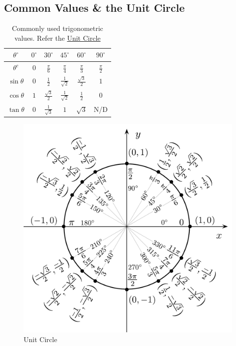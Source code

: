 \documentclass[12pt]{article}
\begin{document}
\subsection{Common Values \& the Unit Circle}
\begin{table}[h]
	\centering
	\renewcommand{\arraystretch}{1.5}
	\begin{tabular}{cccccc}
		\toprule
		$\theta ^ \circ$ & $0^ \circ$ & $30^ \circ$ & $45^ \circ$ & $60^ \circ$ & $90^ \circ$ \\ \midrule
		$\theta ^ c$ & $0$ & $\frac{\pi}{6}$ & $\frac{\pi}{4}$ & $\frac{\pi}{3}$ & $\frac{\pi}{2}$ \\ \midrule
		$\sin \theta$ & $0$ & $\frac{1}{2}$ & $\frac{1}{\sqrt{2}}$ & $\frac{\sqrt{3}}{2}$ & $1$ \\
		$\cos \theta$ & $1$ & $\frac{\sqrt{3}}{2}$ & $\frac{1}{\sqrt{2}}$ & $\frac{1}{2}$ & $0$ \\
		$\tan \theta$ & 0 & $\frac{1}{\sqrt{3}}$ & $1$ & $\sqrt{3}$ & N/D \\ \bottomrule
	\end{tabular}
	\caption{\label{standardvals}Commonly used trigonometric values. Refer the \hyperref[unitcircle]{Unit Circle}}
\end{table}
\begin{figure}[h]
	\centering
	\includegraphics[scale=0.8]{Unit_circle_angles.pdf}
	\caption{\label{unitcircle} Unit Circle}
\end{figure}
\end{document}
